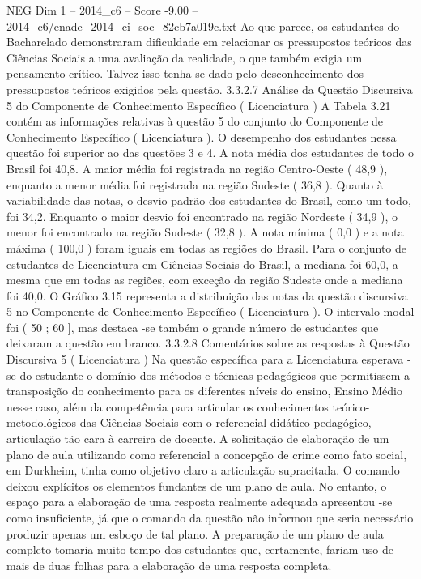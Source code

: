 \begin{textsample}{NEG Dim 1 – 2014\_c6 – Score -9.00 – 2014\_c6/enade\_2014\_ci\_soc\_82cb7a019c.txt}
Ao que parece, os estudantes do Bacharelado demonstraram dificuldade em relacionar os pressupostos teóricos das Ciências Sociais a uma avaliação da realidade, o que também exigia um pensamento crítico.
Talvez isso tenha se dado pelo desconhecimento dos pressupostos teóricos exigidos pela questão. 3.3.2.7 Análise da Questão Discursiva 5 do Componente de Conhecimento Específico ( Licenciatura ) A Tabela 3.21 contém as informações relativas à questão 5 do conjunto do Componente de Conhecimento Específico ( Licenciatura ).
O desempenho dos estudantes nessa questão foi superior ao das questões 3 e 4.
A nota média dos estudantes de todo o Brasil foi 40,8.
A maior média foi registrada na região Centro-Oeste ( 48,9 ), enquanto a menor média foi registrada na região Sudeste ( 36,8 ).
Quanto à variabilidade das notas, o desvio padrão dos estudantes do Brasil, como um todo, foi 34,2.
Enquanto o maior desvio foi encontrado na região Nordeste ( 34,9 ), o menor foi encontrado na região Sudeste ( 32,8 ).
A nota mínima ( 0,0 ) e a nota máxima ( 100,0 ) foram iguais em todas as regiões do Brasil.
Para o conjunto de estudantes de Licenciatura em Ciências Sociais do Brasil, a mediana foi 60,0, a mesma que em todas as regiões, com exceção da região Sudeste onde a mediana foi 40,0.
O Gráfico 3.15 representa a distribuição das notas da questão discursiva 5 no Componente de Conhecimento Específico ( Licenciatura ).
O intervalo modal foi ( 50 ; 60 ], mas destaca -se também o grande número de estudantes que deixaram a questão em branco. 3.3.2.8 Comentários sobre as respostas à Questão Discursiva 5 ( Licenciatura ) Na questão específica para a Licenciatura esperava -se do estudante o domínio dos métodos e técnicas pedagógicos que permitissem a transposição do conhecimento para os diferentes níveis do ensino, Ensino Médio nesse caso, além da competência para articular os conhecimentos teórico-metodológicos das Ciências Sociais com o referencial didático-pedagógico, articulação tão cara à carreira de docente.
A solicitação de elaboração de um plano de aula utilizando como referencial a concepção de crime como fato social, em Durkheim, tinha como objetivo claro a articulação supracitada.
O comando deixou explícitos os elementos fundantes de um plano de aula.
No entanto, o espaço para a elaboração de uma resposta realmente adequada apresentou -se como insuficiente, já que o comando da questão não informou que seria necessário produzir apenas um esboço de tal plano.
A preparação de um plano de aula completo tomaria muito tempo dos estudantes que, certamente, fariam uso de mais de duas folhas para a elaboração de uma resposta completa.

\end{textsample}
